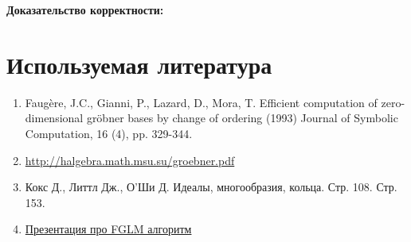 \documentclass{article}
\begin{document}
    \newpage
    \textbf{Доказательство корректности:}
        
\newpage
\section{Используемая литература}
\begin{enumerate}
    \item Faugère, J.C., Gianni, P., Lazard, D., Mora, T. Efficient computation of zero-dimensional gröbner bases by change of ordering (1993) Journal of Symbolic Computation, 16 (4), pp. 329-344.
    \item \href{http://halgebra.math.msu.su/groebner.pdf}{http://halgebra.math.msu.su/groebner.pdf}
    \item Кокс Д., Литтл Дж., О'Ши Д. Идеалы, многообразия, кольца. Стр. 108. Стр. 153. 
    \item \href{https://www.math.lsu.edu/system/files/Groeb_presentation_final.pdf}{Презентация про FGLM алгоритм}
\end{enumerate}
\end{document}
